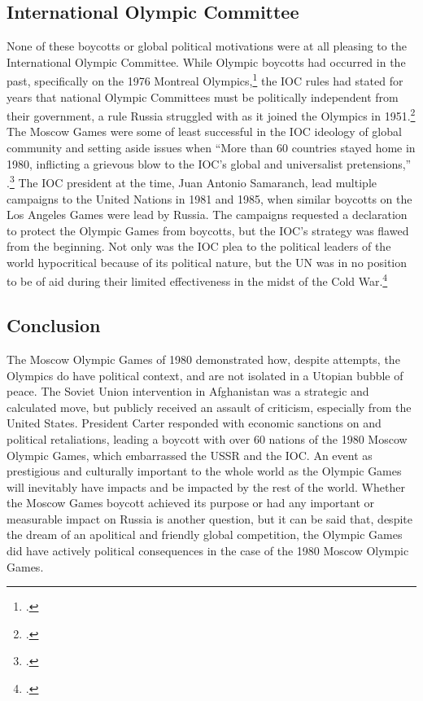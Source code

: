 \documentclass[12pt,letterpaper]{article}
\begin{document}
\subsection{International Olympic Committee}
	None of these boycotts or global political motivations were at all pleasing to the International Olympic Committee. While Olympic boycotts had occurred in the past, specifically on the 1976 Montreal Olympics,\footcite[559]{guttmann_cold_1988} the IOC rules had stated for years that national Olympic Committees must be politically independent from their government, a rule Russia struggled with as it joined the Olympics in 1951.\footcite[557]{guttmann_cold_1988} The Moscow Games were some of least successful in the IOC ideology of global community and setting aside issues when ``More than 60 countries stayed home in 1980, inflicting a grievous blow to the IOC’s global and universalist pretensions,'' \citeauthor{keys_political_2017}.\footcite[1]{keys_political_2017} The IOC president at the time, Juan Antonio Samaranch, lead multiple campaigns to the United Nations in 1981 and 1985, when similar boycotts on the Los Angeles Games were lead by Russia. The campaigns requested a declaration to protect the Olympic Games from boycotts, but the IOC's strategy was flawed from the beginning. Not only was the IOC plea to the political leaders of the world hypocritical because of its political nature, but the UN was in no position to be of aid during their limited effectiveness in the midst of the Cold War.\footcite[2]{keys_political_2017}
	
\subsection{Conclusion}
The Moscow Olympic Games of 1980 demonstrated how, despite attempts, the Olympics do have political context, and are not isolated in a Utopian bubble of peace. The Soviet Union intervention in Afghanistan was a strategic and calculated move, but publicly received an assault of criticism, especially from the United States. President Carter responded with economic sanctions on  and political retaliations, leading a boycott with over 60 nations of the 1980 Moscow Olympic Games, which embarrassed the USSR and the IOC. An event as prestigious and culturally important to the whole world as the Olympic Games will inevitably have impacts and be impacted by the rest of the world. Whether the Moscow Games boycott achieved its purpose or had any important or measurable impact on Russia is another question, but it can be said that, despite the dream of an apolitical and friendly global competition, the Olympic Games did have actively political consequences in the case of the 1980 Moscow Olympic Games. 
\end{document}
